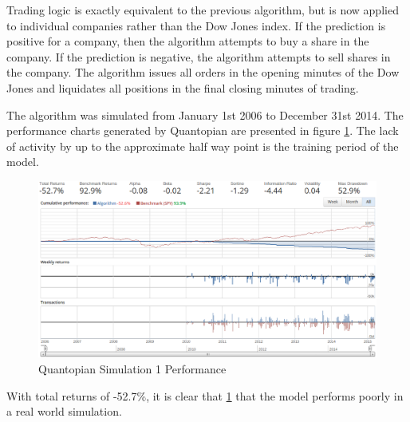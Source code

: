 \documentclass{report}
\begin{document}
Trading logic is exactly equivalent to the previous algorithm, but is now applied to individual companies rather than the Dow Jones index. If the prediction is positive for a company, then the algorithm attempts to buy a share in the company. If the prediction is negative, the algorithm attempts to sell shares in the company. The algorithm issues all orders in the opening minutes of the Dow Jones and liquidates all positions in the final closing minutes of trading.

The algorithm was simulated from January 1st 2006 to December 31st 2014. The performance charts generated by Quantopian are presented in figure \ref{fig:quantopian-2}. The lack of activity by up to the approximate half way point is the training period of the model.

\begin{figure}[H]
	\caption{Quantopian Simulation 1 Performance}
	\vspace{10pt}
	\centerline{\includegraphics[scale=0.4]{vis/quantopian_analysts.png}}
	
	\label{fig:quantopian-2}
\end{figure}

With total returns of -52.7\%, it is clear that \ref{fig:quantopian-2} that the model performs poorly in a real world simulation. 
\end{document}
